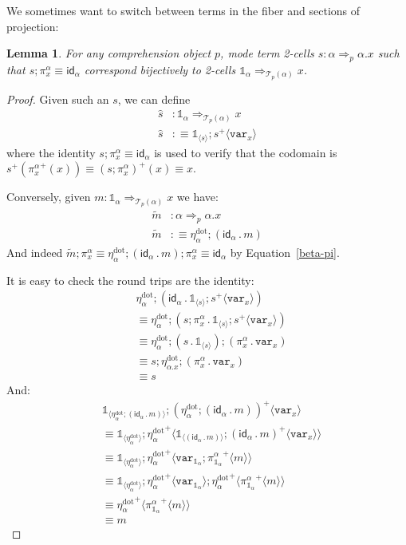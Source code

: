 \documentclass[10pt]{article}
\newtheorem{lemma}{Lemma}
\theoremstyle{definition}
\newcommand{\tcell}{\Rightarrow}
\newcommand{\id}{\mathsf{id}}
\newcommand\TrPlus[2]{\ensuremath{{#1}^+(#2)}}
\newcommand\El[2]{\mathcal{T}_{#1}(#2)}
\newcommand\bdot[0]{\mathbin{.}}
\newcommand\ApPlus[2]{\ensuremath{{#1}^+ \langle #2 \rangle }}
\newcommand{\sdot}{\ensuremath{\mathrm{dot}}}
\newcommand\One{\ensuremath{\mathds{1}}}
\newcommand\var[1]{\ensuremath{\mathtt{var}_{#1}}}
\newcommand\ApOne[1]{\ensuremath{\One_{\langle {#1} \rangle }}}
\begin{document}
We sometimes want to switch between terms in the fiber and sections of projection:
\begin{lemma}\label{sigma:total-to-fiber0} 
For any comprehension object $p$, mode term 2-cells $s : \alpha \tcell_p
\alpha.x$ such that $s;\pi^\alpha_x \equiv \id_\alpha$ correspond
bijectively to 2-cells $\One_\alpha \tcell_{\El{p}{\alpha}} x$.
\end{lemma}
\begin{proof}
Given such an $s$, we can define
\begin{align*}
\hat{s} &: \One_\alpha \tcell_{\El{p}{\alpha}} x \\
\hat{s} &:\equiv \ApOne{s};\ApPlus{s}{\var{x}}
\end{align*}
where the identity $s;\pi^\alpha_x \equiv \id_\alpha$ is used to verify that the codomain is $\TrPlus{s}{\TrPlus{\pi^\alpha_x}{x}} \equiv \TrPlus{(s;\pi^\alpha_x)}{x} \equiv x$.

Conversely, given $m : \One_\alpha \tcell_{\El{p}{\alpha}} x$ we have:
\begin{align*}
\tilde{m} &: \alpha \tcell_p \alpha.x \\
\tilde{m} &:\equiv \eta^\sdot_\alpha ; (\id_\alpha \bdot m)
\end{align*}
And indeed $\tilde{m};\pi^\alpha_x \equiv \eta^\sdot_\alpha ; (\id_\alpha \bdot m);\pi^\alpha_x \equiv \id_\alpha$ by Equation~\eqref{beta-pi}.

It is easy to check the round trips are the identity:
\begin{align*}
&\eta^\sdot_\alpha ; (\id_\alpha \bdot \ApOne{s};\ApPlus{s}{\var{x}}) \\
&\equiv \eta^\sdot_\alpha ; (s;\pi^\alpha_x \bdot \ApOne{s};\ApPlus{s}{\var{x}}) \\
&\equiv \eta^\sdot_\alpha ; (s \bdot \ApOne{s});(\pi^\alpha_x \bdot \var{x}) \\
&\equiv s;\eta^\sdot_{\alpha.x} ; (\pi^\alpha_x \bdot \var{x}) \\
&\equiv s
\end{align*}
And:
\begin{align*}
&\ApOne{\eta^\sdot_\alpha ; (\id_\alpha \bdot m)};\ApPlus{(\eta^\sdot_\alpha ; (\id_\alpha \bdot m))}{\var{x}} \\
&\equiv \ApOne{\eta^\sdot_\alpha};\ApPlus{\eta^\sdot_\alpha}{\ApOne{(\id_\alpha \bdot m)};\ApPlus{(\id_\alpha \bdot m)}{\var{x}}} \\
&\equiv \ApOne{\eta^\sdot_\alpha};\ApPlus{\eta^\sdot_\alpha}{\var{\One_\alpha};\ApPlus{\pi^\alpha_{\One_\alpha}}{m}} \\
&\equiv \ApOne{\eta^\sdot_\alpha};\ApPlus{\eta^\sdot_\alpha}{\var{\One_\alpha}};\ApPlus{\eta^\sdot_\alpha}{\ApPlus{\pi^\alpha_{\One_\alpha}}{m}} \\
&\equiv \ApPlus{\eta^\sdot_\alpha}{\ApPlus{\pi^\alpha_{\One_\alpha}}{m}} \\
&\equiv m
\end{align*}
\end{proof}
\end{document}
